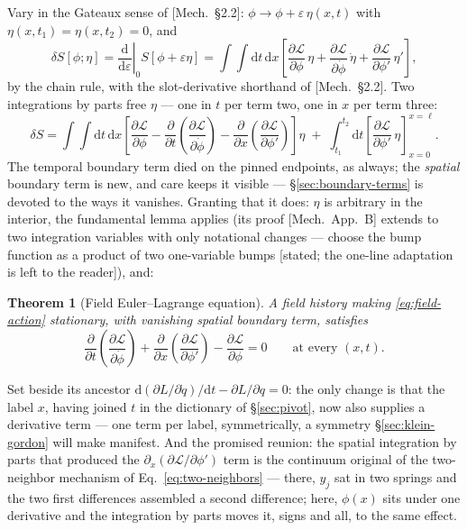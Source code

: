 \documentclass[11pt]{article}
\theoremstyle{plain}
\newtheorem{theorem}{Theorem}[section]
\theoremstyle{definition}
\theoremstyle{remark}
\newcommand{\dd}{\mathrm{d}}
\newcommand{\pd}[2]{\frac{\partial #1}{\partial #2}}
\newcommand{\tot}[2]{\frac{\dd #1}{\dd #2}}
\begin{document}
Vary in the Gateaux sense of [Mech.\ \S2.2]:
$\phi \to \phi + \varepsilon\,\eta(x,t)$ with $\eta(x, t_1) =
\eta(x, t_2) = 0$, and
\begin{equation}
  \delta S[\phi;\eta]
  = \left.\tot{}{\varepsilon}\right|_{0} S[\phi + \varepsilon\eta]
  = \int\!\!\int \dd t\,\dd x
    \left[
      \pd{\mathcal L}{\phi}\,\eta
      + \pd{\mathcal L}{\dot\phi}\,\dot\eta
      + \pd{\mathcal L}{\phi'}\,\eta'
    \right],
  \label{eq:field-first-variation}
\end{equation}
by the chain rule, with the slot-derivative shorthand of
[Mech.\ \S2.2]. Two integrations by parts free $\eta$ --- one in $t$
per term two, one in $x$ per term three:
\begin{equation}
  \delta S
  = \int\!\!\int \dd t\,\dd x
    \left[
      \pd{\mathcal L}{\phi}
      - \pd{}{t}\!\left(\pd{\mathcal L}{\dot\phi}\right)
      - \pd{}{x}\!\left(\pd{\mathcal L}{\phi'}\right)
    \right] \eta
  \;+\;
  \int_{t_1}^{t_2}\!\dd t
    \left[\pd{\mathcal L}{\phi'}\,\eta\right]_{x=0}^{x=\ell}.
  \label{eq:field-variation-ibp}
\end{equation}
The temporal boundary term died on the pinned endpoints, as always;
the \emph{spatial} boundary term is new, and care keeps
it visible --- \S\ref{sec:boundary-terms} is devoted to the ways it
vanishes. Granting that it does: $\eta$ is arbitrary in the interior,
the fundamental lemma applies (its proof [Mech.\ App.\ B] extends to
two integration variables with only notational changes --- choose the
bump function as a product of two one-variable bumps [stated; the
one-line adaptation is left to the reader]), and:

\begin{theorem}[Field Euler--Lagrange equation]\label{thm:field-EL}
A field history making \eqref{eq:field-action} stationary, with
vanishing spatial boundary term, satisfies
\begin{equation}
  \boxed{\;
  \pd{}{t}\!\left(\pd{\mathcal L}{\dot\phi}\right)
  + \pd{}{x}\!\left(\pd{\mathcal L}{\phi'}\right)
  - \pd{\mathcal L}{\phi}
  = 0
  \qquad \text{at every } (x, t).
  \;}
  \label{eq:field-EL}
\end{equation}
\end{theorem}

\noindent
Set beside its ancestor
$\dd(\partial L/\partial\dot q)/\dd t - \partial L/\partial q = 0$:
the only change is that the label $x$, having joined $t$ in the
dictionary of \S\ref{sec:pivot}, now also supplies a derivative term
--- one term per label, symmetrically, a symmetry \S\ref{sec:klein-gordon}
will make manifest. And the promised reunion: the spatial integration
by parts that produced the $\partial_x(\partial\mathcal L/\partial\phi')$
term is the continuum original of the two-neighbor mechanism of
Eq.~\eqref{eq:two-neighbors} --- there, $y_j$ sat in two springs and
the two first differences assembled a second difference; here, $\phi(x)$
sits under one derivative and the integration by parts moves it,
signs and all, to the same effect.
\end{document}
